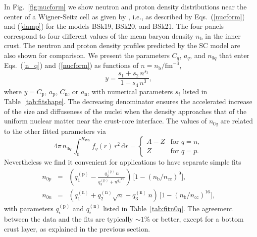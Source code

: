 \documentclass{aa}
\newcommand{\dd}{\mathrm{d}}
\newcommand{\nb}{n_\mathrm{b}}
\newcommand{\nc}{n_\mathrm{cc}}
\newcommand{\RWS}{R_\mathrm{WS}}
\begin{document}
In Fig.~\ref{fig:nucform} we show neutron and proton density
distributions  near the center of a Wigner-Seitz cell as
given by \citet{Pearson-ea12}, i.e., as described by
Eqs.~(\ref{nucform}) and  (\ref{damp}) for the models
BSk19,  BSk20, and BSk21. The four panels correspond to
four different values of the mean baryon density $\nb$ in
the inner crust. The neutron and proton density  profiles
predicted by the SC model are also shown for comparison. We
present  the parameters $C_q$, $a_q$, and $n_{0q}$ that
enter Eqs.~(\ref{n_q}) and  (\ref{nucform}) as functions of
$n=\nb/\textrm{fm}^{-3}$,
\begin{equation}
  y
            =
       \frac{s_1+s_2\,n^{s_3}}{
         1-s_4\,n^3},
\label{fitshape}
\end{equation}
where $y=C_\mathrm{p}$, $a_\mathrm{p}$, $C_\mathrm{n}$, or $a_\mathrm{n}$, with numerical parameters $s_i$ listed 
in Table~\ref{tab:fitshape}. The decreasing denominator ensures the
accelerated increase of the size and diffuseness of the nuclei when the density
approaches that of the uniform nuclear matter near the crust-core interface.
The values of $n_{0q}$ are related to the other fitted 
parameters via
\begin{equation}
   4\pi\,n_{0q}\,\int_0^{\RWS}\! f_q(r)\,r^2\,\dd r 
            = \left\{ \begin{array}{cl}
                A-Z & \mbox{for~} q=n, \\
                 Z  & \mbox{for~} q=p.
         \end{array} \right.
\end{equation}
Nevertheless we find it convenient for applications to have
separate simple fits
\begin{eqnarray}
   n_{0p} &=& \left(
         q^\mathrm{(p)}_1 - \frac{q^\mathrm{(p)}_2 \, n }{ q^\mathrm{(p)}_3 + n^{q^\mathrm{(p)}_4}}
             \right)\,
           \big[  1-(\nb/\nc)^9  \big],
\label{fitn0p}
\\
   n_{0n} &=&  \left(
        q^\mathrm{(n)}_1 + q^\mathrm{(n)}_2 \sqrt{n} - q^\mathrm{(n)}_3\,n
             \right)\,
           \big[  1-(\nb/\nc)^{16}  \big],
\label{fitn0n}
\end{eqnarray}
with parameters $q^\mathrm{(p)}_i$ and $q^\mathrm{(n)}_i$ listed in
Table~\ref{tab:fitn0q}.
The agreement between the
data and the fits are typically $\sim1$\% or better, 
except for a bottom crust layer,
as explained in the previous section.
\end{document}

